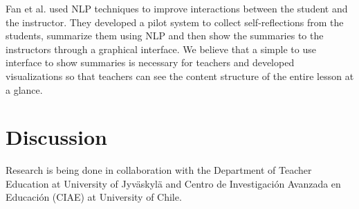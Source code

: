 \documentclass[utf8,english]{gradu3}
\begin{document}
Fan et al. \parencite*{fanCourseMIRROREnhancingLarge2015} used NLP techniques to improve interactions between the student and the instructor. They developed a pilot system to collect self-reflections from the students, summarize them using NLP and then show the summaries to the instructors through a graphical interface. We believe that a simple to use interface to show summaries is necessary for teachers and developed visualizations so that teachers can see the content structure of the entire lesson at a glance.



\chapter{Discussion}

Research is being done in collaboration with the Department of Teacher Education at University of Jyväskylä and Centro de Investigación Avanzada en Educación (CIAE) at University of Chile.
 
\printbibliography
\end{document}

